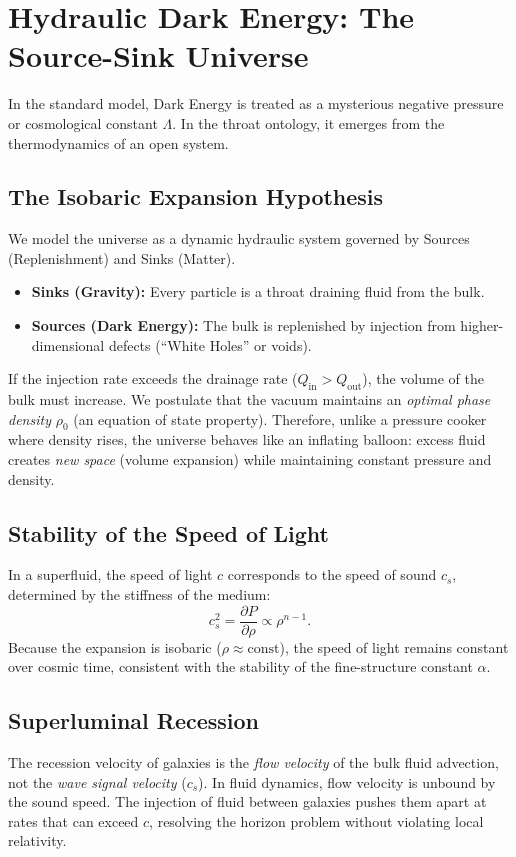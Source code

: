 \documentclass[12pt]{article}
\begin{document}
\section{Hydraulic Dark Energy: The Source-Sink Universe}
\label{sec:dark_energy}

In the standard model, Dark Energy is treated as a mysterious negative pressure or cosmological constant $\Lambda$. In the throat ontology, it emerges from the thermodynamics of an open system.

\subsection{The Isobaric Expansion Hypothesis}
We model the universe as a dynamic hydraulic system governed by Sources (Replenishment) and Sinks (Matter).
\begin{itemize}
    \item \textbf{Sinks (Gravity):} Every particle is a throat draining fluid from the bulk.
    \item \textbf{Sources (Dark Energy):} The bulk is replenished by injection from higher-dimensional defects (``White Holes'' or voids).
\end{itemize}
If the injection rate exceeds the drainage rate ($Q_{\text{in}} > Q_{\text{out}}$), the volume of the bulk must increase.
We postulate that the vacuum maintains an \emph{optimal phase density} $\rho_0$ (an equation of state property). Therefore, unlike a pressure cooker where density rises, the universe behaves like an inflating balloon: excess fluid creates \emph{new space} (volume expansion) while maintaining constant pressure and density.

\subsection{Stability of the Speed of Light}
In a superfluid, the speed of light $c$ corresponds to the speed of sound $c_s$, determined by the stiffness of the medium:
\begin{equation}
  c_s^2 = \frac{\partial P}{\partial \rho} \propto \rho^{n-1}.
\end{equation}
Because the expansion is isobaric ($\rho \approx \text{const}$), the speed of light remains constant over cosmic time, consistent with the stability of the fine-structure constant $\alpha$.

\subsection{Superluminal Recession}
The recession velocity of galaxies is the \emph{flow velocity} of the bulk fluid advection, not the \emph{wave signal velocity} ($c_s$). In fluid dynamics, flow velocity is unbound by the sound speed. The injection of fluid between galaxies pushes them apart at rates that can exceed $c$, resolving the horizon problem without violating local relativity.
\end{document}
